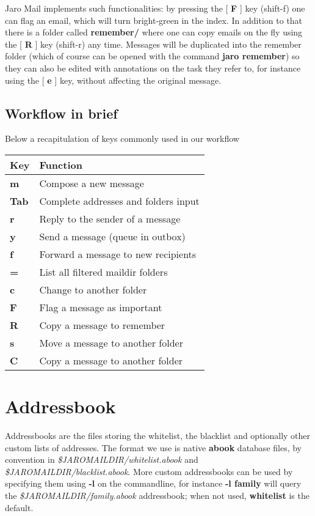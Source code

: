\documentclass[a4,onecolumn,portrait]{article}
\begin{document}
Jaro Mail implements such functionalities: by pressing the [ \textbf{F} ] key
(shift-f) one can flag an email, which will turn bright-green in the
index. In addition to that there is a folder called \textbf{remember/} where
one can copy emails on the fly using the [ \textbf{R} ] key (shift-r) any
time. Messages will be duplicated into the remember folder (which of
course can be opened with the command \textbf{jaro remember}) so they can
also be edited with annotations on the task they refer to, for
instance using the [ \textbf{e} ] key, without affecting the original
message.
\subsection{Workflow in brief}
\label{sec-6-6}

Below a recapitulation of keys commonly used in our workflow

\begin{center}
\begin{tabular}{ll}
Key & Function\\
\hline
\textbf{m} & Compose a new message\\
\textbf{Tab} & Complete addresses and folders input\\
\textbf{r} & Reply to the sender of a message\\
\textbf{y} & Send a message (queue in outbox)\\
\textbf{f} & Forward a message to new recipients\\
\textbf{=} & List all filtered maildir folders\\
\textbf{c} & Change to another folder\\
\textbf{F} & Flag a message as important\\
\textbf{R} & Copy a message to remember\\
\textbf{s} & Move a message to another folder\\
\textbf{C} & Copy a message to another folder\\
\end{tabular}
\end{center}

\section{Addressbook}
\label{sec-7}

Addressbooks are the files storing the whitelist, the blacklist and optionally other custom lists of addresses. The format we use is native \textbf{abook} database files, by convention in \emph{\$JAROMAILDIR/whitelist.abook} and \emph{\$JAROMAILDIR/blacklist.abook}. More custom addressbooks can be used by specifying them using \textbf{-l} on the commandline, for instance \textbf{-l family} will query the \emph{\$JAROMAILDIR/family.abook} addressbook; when not used, \textbf{whitelist} is the default.
\end{document}

